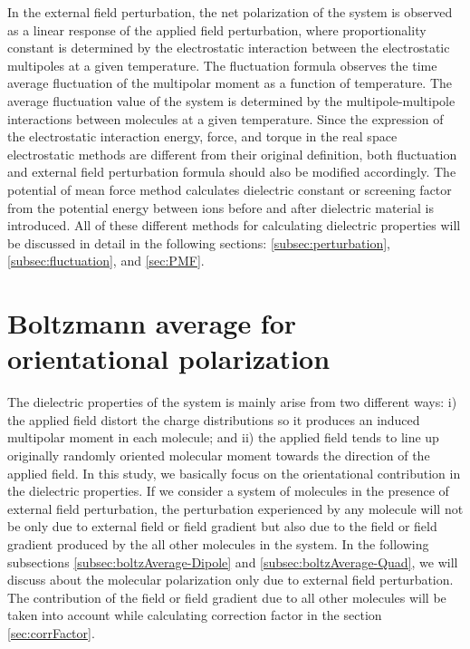In the external field perturbation, the net polarization of the system
is observed as a linear response of the applied field perturbation,
where proportionality constant is determined by the electrostatic
interaction between the electrostatic multipoles at a given
temperature. The fluctuation formula observes the time average
fluctuation of the multipolar moment as a function of temperature. The
average fluctuation value of the system is determined by the
multipole-multipole interactions between molecules at a given
temperature. Since the expression of the electrostatic interaction
energy, force, and torque in the real space electrostatic methods are
different from their original definition, both fluctuation and
external field perturbation formula should also be modified
accordingly. The potential of mean force method calculates dielectric
constant or screening factor from the potential energy between ions before and after dielectric material is introduced. All of these different methods for
calculating dielectric properties will be discussed in detail in the
following sections: \ref{subsec:perturbation},\ref{subsec:fluctuation}, and \ref{sec:PMF}.

\section{Boltzmann average for orientational polarization}
The dielectric properties of the system is mainly arise from two different ways: i) the applied field distort the charge distributions so it produces an induced multipolar moment in each molecule; and ii) the applied field tends to line up originally randomly oriented molecular moment towards the direction of the applied field. In this study, we basically focus on the orientational contribution in the dielectric properties. If we consider a system of molecules in the presence of external field perturbation, the perturbation experienced by any molecule will not be only due to external field or field gradient but also due to the field or field gradient produced by the all other molecules in the system. In the following subsections \ref{subsec:boltzAverage-Dipole} and \ref{subsec:boltzAverage-Quad}, we will discuss about the molecular polarization only due to external field perturbation. The contribution of the field or field gradient due to all other molecules will be taken into account while calculating correction factor in the section \ref{sec:corrFactor}.

